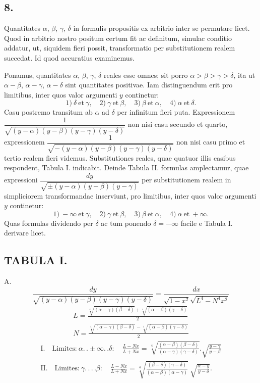 \documentclass{article}
\begin{document}

\subsection*{8.}

Quantitates $\alpha$, $\beta$, $\gamma$, $\delta$ in formulis propositis ex arbitrio inter se permutare licet. Quod in arbitrio nostro positum certum fit ac definitum, simulac conditio addatur, ut, siquidem fieri possit, transformatio per substitutionem realem succedat. Id quod accuratius examinemus.

Ponamus, quantitates $\alpha$, $\beta$, $\gamma$, $\delta$ reales esse omnes; sit porro $\alpha>\beta>\gamma>\delta$, ita ut $\alpha-\beta$, $\alpha-\gamma$, $\alpha-\delta$ sint quantitates positivae. Iam distinguendum erit pro limitibus, inter quos valor argumenti $y$ continetur:
\[
\text{1)}\ \delta\ \text{et}\ \gamma,\quad\text{2)}\ \gamma\ \text{et}\ \beta,\quad\text{3)}\ \beta\ \text{et}\ \alpha,\quad\text{4)}\ \alpha\ \text{et}\ \delta.
\]
Casu postremo transitum ab $\alpha$ ad $\delta$ per infinitum fieri puta. Expressionem $\dfrac{1}{\sqrt{(y-\alpha)(y-\beta)(y-\gamma)(y-\delta)}}$ non nisi casu secundo et quarto, expressionem $\dfrac{1}{\sqrt{-(y-\alpha)(y-\beta)(y-\gamma)(y-\delta)}}$ non nisi casu primo et tertio realem fieri videmus. Substitutiones reales, quae quatuor illis casibus respondent, Tabula I. indicabit. Deinde Tabula II. formulas amplectamur, quae expressioni $\dfrac{dy}{\sqrt{\pm(y-\alpha)(y-\beta)(y-\gamma)}}$ per substitutionem realem in simpliciorem transformandae inserviunt, pro limitibus, inter quos valor argumenti $y$ continetur:
\[
\text{1)}\ -\infty\ \text{et}\ \gamma,\quad\text{2)}\ \gamma\ \text{et}\ \beta,\quad\text{3)}\ \beta\ \text{et}\ \alpha,\quad\text{4)}\ \alpha\ \text{et}\ +\infty.
\]
Quas formulas dividendo per $\delta$ ac tum ponendo $\delta=-\infty$ facile e Tabula I. derivare licet.


\subsection*{TABULA I.}

A.
\[
\frac{dy}{\sqrt{(y-\alpha)(y-\beta)(y-\gamma)(y-\delta)}}=\frac{dx}{\sqrt{1-x^{2}}\sqrt{L^{4}-N^{4}x^{2}}}
\]
\[
\begin{gathered}
L=\frac{\sqrt[4]{(\alpha-\gamma)(\beta-\delta)}+\sqrt[4]{(\alpha-\beta)(\gamma-\delta)}}{2}\\
N=\frac{\sqrt[4]{(\alpha-\gamma)(\beta-\delta)}-\sqrt[4]{(\alpha-\beta)(\gamma-\delta)}}{2}
\end{gathered}
\]
\[
\begin{gathered}
\text{I.}\quad\text{Limites:}\ \alpha.\,.\pm\infty.\,.\delta:\quad\frac{L-Nx}{L+Nx}=\sqrt[4]{\frac{(\alpha-\beta)(\beta-\delta)}{(\alpha-\gamma)(\gamma-\delta)}}.\sqrt{\frac{y-\gamma}{y-\beta}}\\
\text{II.}\quad\text{Limites:}\ \gamma.\,.\,.\,.\beta:\quad\frac{L-Nx}{L+Nx}=\sqrt[4]{\frac{(\beta-\delta)(\gamma-\delta)}{(\alpha-\beta)(\alpha-\gamma)}}\ \sqrt{\frac{\alpha-y}{y-\delta}}.
\end{gathered}
\]
\end{document}

